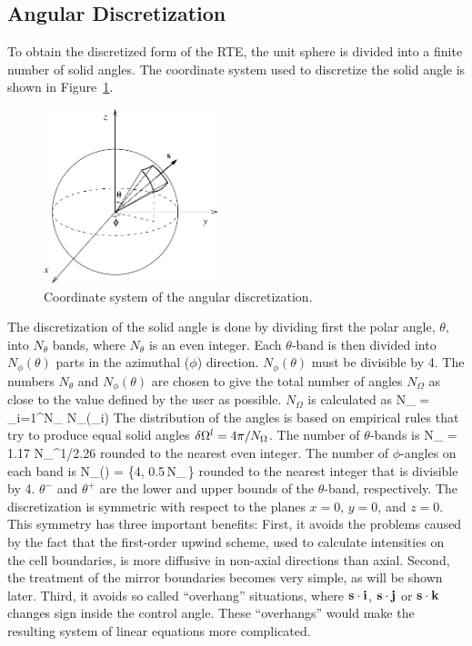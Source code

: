 \subsection{Angular Discretization}
\label{radiation-discre}


To obtain the discretized form of the
RTE, the unit sphere is divided into a finite number of solid angles.
The coordinate system used to discretize the solid angle is
shown in Figure~\ref{Angular}.
\begin{figure}[ht]
\begin{center}
\includegraphics[height=2in]{FIGURES/RadCoord}
\caption{Coordinate system of the angular discretization.}
\label{Angular}
\end{center}
\end{figure}
The discretization of the solid angle is done by dividing first
the polar angle, $\theta$, into $N_{\theta}$ bands, where
$N_{\theta}$ is an even integer.
Each $\theta$-band is then divided into
$N_{\phi}(\theta)$ parts in the azimuthal ($\phi$) direction.
$N_{\phi}(\theta)$ must be divisible by 4.
The numbers $N_{\theta}$ and $N_{\phi}(\theta)$ are chosen
to give the total number of angles $N_{\Omega}$ as close to
the value defined by the user as possible.
$N_{\Omega}$ is calculated as
\be
 N_{\Omega} = \sum_{i=1}^{N_{\theta}} N_{\phi}(\theta_i)
\ee
The distribution of the angles is based on empirical rules that try
to produce equal solid angles $\delta {\Omega}^l = 4\pi/N_{\Omega}$. The
number of $\theta$-bands is
\be
 N_{\theta} = 1.17 \; N_{\Omega}^{1/2.26}
\ee
rounded to the nearest even integer. The number of $\phi$-angles
on each band is
\be
 N_{\phi}(\theta) = \max\left\{4,
        0.5\,N_{\Omega}\,\left[\cos(\theta^-)-\cos(\theta^+)\right]\right\}
\ee
rounded to the nearest integer that is divisible by 4.
$\theta^-$ and $\theta^+$ are
the lower and upper bounds of the $\theta$-band, respectively.
The discretization is symmetric with respect to the planes $x=0$, $y=0$, and
$z=0$. This symmetry has three important benefits:
First, it avoids the problems caused by the fact that the first-order
upwind scheme, used to calculate intensities on the cell boundaries,
is more diffusive in non-axial directions than axial.
Second, the treatment of the mirror boundaries becomes very simple, as
will be shown later. Third,
it avoids so called
``overhang'' situations, where ${\bf s}\cdot {\bf i}$, ${\bf s}\cdot {\bf j}$
or ${\bf s}\cdot {\bf k}$ changes sign inside
the control angle. These ``overhangs'' would make the resulting system of
linear equations more complicated.

